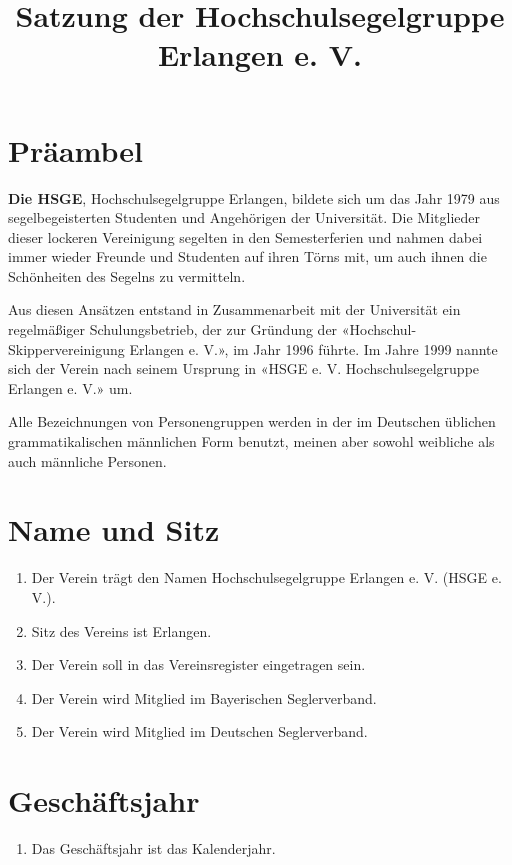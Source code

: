 \documentclass[10pt, twocolumn, parskip=half]{scrartcl}
\title{\large Satzung der Hochschulsegelgruppe Erlangen e. V.}
\date{\vspace{-5ex}}
\begin{document}

\section*{Präambel}
\textbf{Die HSGE}, Hochschulsegelgruppe Erlangen, bildete sich um
das Jahr 1979 aus segelbegeisterten Studenten und Angehörigen der Universität. Die
Mitglieder dieser lockeren Vereinigung segelten in den Semesterferien und nahmen dabei immer wieder Freunde und Studenten auf ihren Törns mit, um auch ihnen die Schönheiten des Segelns zu vermitteln.

Aus diesen Ansätzen entstand in Zusammenarbeit mit der Universität ein regelmäßiger
Schulungsbetrieb, der zur Gründung der «Hochschul-Skippervereinigung Erlangen e. V.», im
Jahr 1996 führte. Im Jahre 1999 nannte sich der Verein nach seinem Ursprung in «HSGE e. V. Hochschulsegelgruppe Erlangen e. V.» um.

Alle Bezeichnungen von Personengruppen werden in der im Deutschen üblichen
grammatikalischen männlichen Form benutzt, meinen aber sowohl weibliche als auch
männliche Personen.


\section{Name und Sitz}
\begin{enumerate}[noitemsep]
	\setlength\itemsep{0em}
	\item Der Verein trägt den Namen Hochschulsegelgruppe Erlangen e. V. (HSGE e. V.).
	\item Sitz des Vereins ist Erlangen.
	\item Der Verein soll in das Vereinsregister eingetragen sein.
	\item Der Verein wird Mitglied im Bayerischen Seglerverband.
	\item Der Verein wird Mitglied im Deutschen Seglerverband.
\end{enumerate}

\section{Geschäftsjahr}
\begin{enumerate}[noitemsep]
	\item Das Geschäftsjahr ist das Kalenderjahr.
\end{enumerate}
\end{document}
